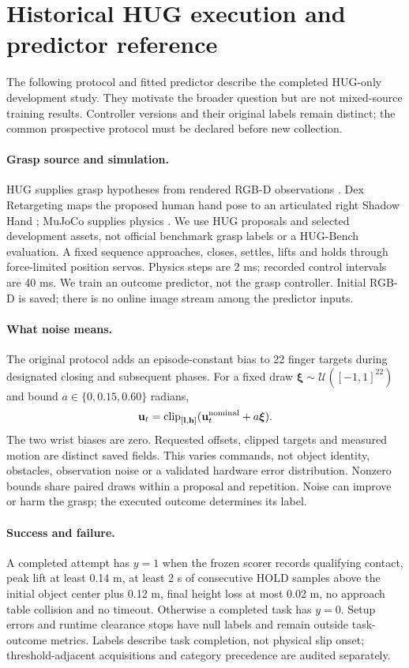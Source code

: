 \documentclass[10pt,letterpaper]{article}
\begin{document}
\section{Historical HUG execution and predictor reference}
The following protocol and fitted predictor describe the completed HUG-only
development study. They motivate the broader question but are not mixed-source
training results. Controller versions and their original labels remain distinct;
the common prospective protocol must be declared before new collection.
\paragraph{Grasp source and simulation.}
HUG supplies grasp hypotheses from rendered RGB-D observations \cite{hug}.
Dex Retargeting maps the proposed human hand pose to an articulated right
Shadow Hand \cite{dex}; MuJoCo supplies physics \cite{mujoco}. We use HUG
proposals and selected development assets, not official benchmark grasp labels
or a HUG-Bench evaluation. A fixed sequence approaches, closes, settles, lifts
and holds through force-limited position servos. Physics steps are 2 ms;
recorded control intervals are 40 ms. We train an outcome predictor, not the
grasp controller. Initial RGB-D is saved; there is no online image stream among
the predictor inputs.

\paragraph{What noise means.}
The original  protocol adds an episode-constant
bias to 22 finger targets during designated closing and subsequent phases.
For a fixed draw $\boldsymbol\xi\sim\mathcal U([-1,1]^{22})$ and bound
$a\in\{0,0.15,0.60\}$ radians,
\[
 \mathbf u_t=\operatorname{clip}_{[\mathbf l,\mathbf h]}
 (\mathbf u_t^{\rm nominal}+a\boldsymbol\xi).
\]
The two wrist biases are zero. Requested offsets, clipped targets and measured
motion are distinct saved fields. This varies commands, not object identity,
obstacles, observation noise or a validated hardware error distribution.
Nonzero bounds share paired draws within a proposal and repetition. Noise can
improve or harm the grasp; the executed outcome determines its label.

\paragraph{Success and failure.}
A completed attempt has $y=1$ when the frozen scorer records qualifying contact,
peak lift at least 0.14 m, at least 2 s of consecutive HOLD samples above the
initial object center plus 0.12 m, final height loss at most 0.02 m, no approach
table collision and no timeout. Otherwise a completed task has $y=0$.
Setup errors and runtime clearance stops have null labels and remain outside
task-outcome metrics. Labels describe task completion, not physical slip onset;
threshold-adjacent acquisitions and category precedence are audited separately.
\end{document}
